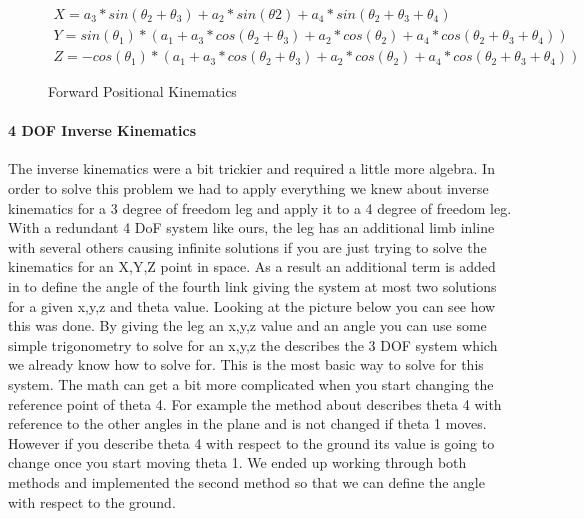             \begin{figure}[H]
            \centering
            \begin{gather*}
            X = a_3*sin(\theta_2+\theta_3)+a_2*sin(\theta2)+a_4*sin(\theta_2+\theta_3+\theta_4)\\
            Y = sin(\theta_1)*(a_1+a_3*cos(\theta_2+\theta_3)+a_2*cos(\theta_2)+a_4*cos(\theta_2+\theta_3+\theta_4))\\
            Z = -cos(\theta_1)*(a_1+a_3*cos(\theta_2+\theta_3)+a_2*cos(\theta_2)+a_4*cos(\theta_2+\theta_3+\theta_4))
            \end{gather*}
            
            \caption{Forward Positional Kinematics}
            \label{fig:FWKin_Robot}
            \end{figure}
        
            \paragraph{4 DOF Inverse Kinematics} The inverse kinematics were a bit trickier and required a little more algebra. In order to solve this problem we had to apply everything we knew about inverse kinematics for a 3 degree of freedom leg and apply it to a 4 degree of freedom leg. With a redundant 4 DoF system like ours, the leg has an additional limb inline with several others causing infinite solutions if you are just trying to solve the kinematics for an X,Y,Z point in space. As a result an additional term is added in to define the angle of the fourth link giving the system at most two solutions for a given x,y,z and theta value. Looking at the picture below you can see how this was done. By giving the leg an x,y,z value and an angle you can use some simple trigonometry to solve for an x,y,z the describes the 3 DOF system which we already know how to solve for. This is the most basic way to solve for this system. The math can get a bit more complicated when you start changing the reference point of theta 4. For example the method about describes theta 4 with reference to the other angles in the plane and is not changed if theta 1 moves. However if you describe theta 4 with respect to the ground its value is going to change once you start moving theta 1. We ended up working through both methods and implemented the second method so that we can define the angle with respect to the ground.
            
